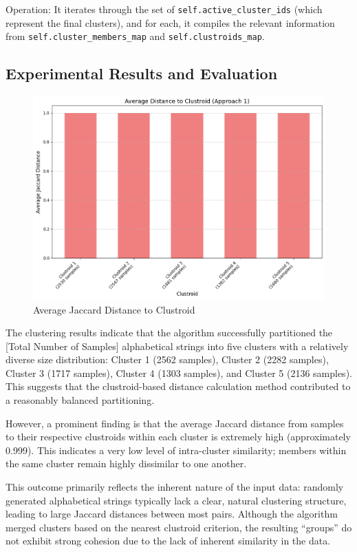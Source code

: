 Operation: It iterates through the set of \texttt{self.active\_cluster\_ids} (which represent the final clusters), and for each, it compiles the relevant information from \texttt{self.cluster\_members\_map} and \texttt{self.clustroids\_map}.

\subsection{Experimental Results and Evaluation}
\label{subsec:experimental-results-and-evaluation-ahc}

\begin{figure}[H]
    \centering
    \includegraphics[width=\linewidth]{images/clustroid_distance}
    \caption{Average Jaccard Distance to Clustroid}
    \label{fig:clustroid_distance}
\end{figure}

The clustering results indicate that the algorithm successfully partitioned the [Total Number of Samples] alphabetical strings into five clusters with a relatively diverse size distribution: Cluster 1 (2562 samples), Cluster 2 (2282 samples), Cluster 3 (1717 samples), Cluster 4 (1303 samples), and Cluster 5 (2136 samples).
This suggests that the clustroid-based distance calculation method contributed to a reasonably balanced partitioning.

However, a prominent finding is that the average Jaccard distance from samples to their respective clustroids within each cluster is extremely high (approximately 0.999).
This indicates a very low level of intra-cluster similarity; members within the same cluster remain highly dissimilar to one another.

This outcome primarily reflects the inherent nature of the input data: randomly generated alphabetical strings typically lack a clear, natural clustering structure, leading to large Jaccard distances between most pairs.
Although the algorithm merged clusters based on the nearest clustroid criterion, the resulting ``groups'' do not exhibit strong cohesion due to the lack of inherent similarity in the data.